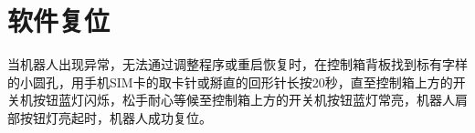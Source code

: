 \chapter{软件复位}

当机器人出现异常，无法通过调整程序或重启恢复时，在控制箱背板找到标有字样的小圆孔，用手机SIM卡的取卡针或掰直的回形针长按20秒，直至控制箱上方的开关机按钮蓝灯闪烁，松手耐心等候至控制箱上方的开关机按钮蓝灯常亮，机器人肩部按钮灯亮起时，机器人成功复位。

